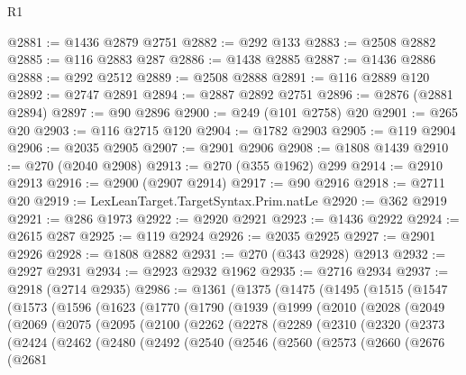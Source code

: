 \begin{lexlean}{R1}
\begin{coremodule}
@2881 := @1436 @2879 @2751
@2882 := @292 @133
@2883 := @2508 @2882
@2885 := @116 @2883 @287
@2886 := @1438 @2885
@2887 := @1436 @2886
@2888 := @292 @2512
@2889 := @2508 @2888
@2891 := @116 @2889 @120
@2892 := @2747 @2891
@2894 := @2887 @2892 @2751
@2896 := @2876 (@2881 @2894)
@2897 := @90 @2896
@2900 := @249 (@101 @2758) @20
@2901 := @265 @20
@2903 := @116 @2715 @120
@2904 := @1782 @2903
@2905 := @119 @2904
@2906 := @2035 @2905
@2907 := @2901 @2906
@2908 := @1808 @1439
@2910 := @270 (@2040 @2908)
@2913 := @270 (@355 @1962) @299
@2914 := @2910 @2913
@2916 := @2900 (@2907 @2914)
@2917 := @90 @2916
@2918 := @2711 @20
@2919 := LexLeanTarget.TargetSyntax.Prim.natLe
@2920 := @362 @2919
@2921 := @286 @1973
@2922 := @2920 @2921
@2923 := @1436 @2922
@2924 := @2615 @287
@2925 := @119 @2924
@2926 := @2035 @2925
@2927 := @2901 @2926
@2928 := @1808 @2882
@2931 := @270 (@343 @2928) @2913
@2932 := @2927 @2931
@2934 := @2923 @2932 @1962
@2935 := @2716 @2934
@2937 := @2918 (@2714 @2935)
@2986 := @1361
    (@1375
      (@1475
        (@1495
          (@1515
            (@1547
              (@1573
                (@1596
                  (@1623
                    (@1770
                      (@1790
                        (@1939
                          (@1999
                            (@2010
                              (@2028
                                (@2049
                                  (@2069
                                    (@2075
                                      (@2095
                                        (@2100
                                          (@2262
                                            (@2278
                                              (@2289
                                                (@2310
                                                  (@2320
                                                    (@2373
                                                      (@2424
                                                        (@2462
                                                          (@2480
                                                            (@2492
                                                              (@2540
                                                                (@2546
                                                                  (@2560
                                                                    (@2573
                                                                      (@2660
                                                                        (@2676
                                                                          (@2681

\end{coremodule}
\end{lexlean}
